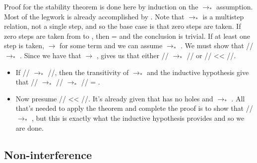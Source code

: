 \documentclass[12pt]{report}
\begin{document}
Proof for the stability theorem is done here by induction on the
 $\to_*$  assumption. Most of the legwork is
already accomplished by . Note that
 $\to_*$  is a multistep relation, not
a single step, and so the base case is that zero steps are taken. If
zero steps are taken from  to , then
 =  and the conclusion is trivial. If at
least one step is taken,  $\to$  for some
term  and we can assume          $\to_*$
. We must show that
// $\to_*$ .  Since we
have that     $\to$ ,
 gives us that either
// $\to_*$
// or
// <<
//.



\begin{itemize}

\item  If // $\to_*$
    //, then the transitivity of
        $\to_*$ and the inductive hypothesis give that
        // $\to_*$
        // $\to_*$
        // = .



\item  Now presume // <<
    //. It's already given that
         has no holes and  $\to_*$
        . All that's needed to apply the
         theorem and complete the proof is to
        show that // $\to_*$
        , but this is exactly what the inductive
        hypothesis provides and so we are done.

\end{itemize}




\subsection{Non-interference}


\newcommand{\prune}[1]{\backslash\backslash {#1} //}
\end{document}
